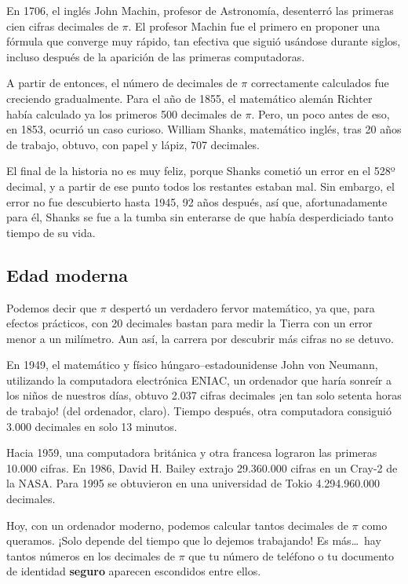 En 1706, el inglés John Machin, profesor de Astronomía, desenterró las primeras cien cifras decimales de $\pi$. El profesor 
Machin fue el primero en proponer una fórmula que converge muy rápido, tan efectiva que siguió usándose durante siglos, incluso 
después de la aparición de las primeras computadoras.

A partir de entonces, el número de decimales de $\pi$ correctamente calculados fue creciendo gradualmente. 
Para el año de 1855, el matemático alemán Richter había calculado ya los primeros 500 decimales de $\pi$. Pero, un poco 
antes de eso, en 1853, ocurrió un caso curioso. William Shanks, matemático inglés, tras 20 años de trabajo, obtuvo, 
con papel y lápiz, 707 decimales. 

El final de la historia no es muy feliz, porque Shanks cometió un error en el 528º decimal, y a partir de ese punto todos 
los restantes estaban mal. Sin embargo, el error no fue descubierto hasta 1945, 92 años después, así que, afortunadamente 
para él, Shanks se fue a la tumba sin enterarse de que había desperdiciado tanto tiempo de su vida.

\subsection*{Edad moderna}
Podemos decir que $\pi$ despertó un verdadero fervor matemático, ya que, para efectos prácticos, con 20 decimales bastan 
para medir la Tierra con un error menor a un milímetro. Aun así, la carrera por descubrir más cifras no se detuvo.

En 1949, el matemático y físico húngaro--estadounidense John von Neumann, utilizando la computadora electrónica ENIAC, 
un ordenador que haría sonreír a los niños de nuestros días, obtuvo 2.037 cifras decimales ¡en tan solo setenta horas de 
trabajo! (del ordenador, claro). Tiempo después, otra computadora consiguió 3.000 decimales en solo 13 minutos.

Hacia 1959, una computadora británica y otra francesa lograron las primeras 10.000 cifras. 
En 1986, David H. Bailey extrajo 29.360.000 cifras en un Cray-2 de la NASA. Para 1995 se obtuvieron en una universidad 
de Tokio 4.294.960.000 decimales. 

Hoy, con un ordenador moderno, podemos calcular tantos decimales de $\pi$ como queramos. ¡Solo depende del tiempo que lo dejemos trabajando!  
Es más\ldots\ hay tantos números en los decimales de $\pi$ que tu número de teléfono o tu documento de identidad \textbf{seguro} 
aparecen escondidos entre ellos.

